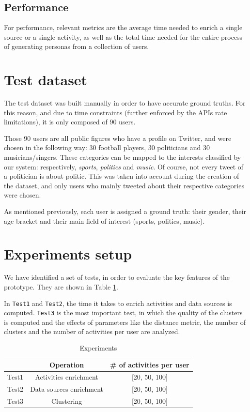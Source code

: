 \subsection{Performance}
For performance, relevant metrics are the average time needed to enrich a single source or a single activity, as well as the total time needed for the entire process of generating personas from a collection of users.

\section{Test dataset}
The test dataset was built manually in order to have accurate ground truths. For this reason, and due to time constraints (further enforced by the APIs rate limitations), it is only composed of 90 users.

Those 90 users are all public figures who have a profile on Twitter, and were chosen in the following way: 30 football players, 30 politicians and 30 musicians/singers. These categories can be mapped to the interests classified by our system: respectively, \textit{sports}, \textit{politics} and \textit{music}. Of course, not every tweet of a politician is about politic. This was taken into account during the creation of the dataset, and only users who mainly tweeted about their respective categories were chosen.

As mentioned previously, each user is assigned a ground truth: their gender, their age bracket and their main field of interest (sports, politics, music).

\section{Experiments setup}
We have identified a set of tests, in order to evaluate the key features of the prototype. They are shown in Table \ref{table:experiments}.

In \texttt{Test1} and \texttt{Test2}, the time it takes to enrich activities and data sources is computed. \texttt{Test3} is the most important test, in which the quality of the clusters is computed and the effects of parameters like the distance metric, the number of clusters and the number of activities per user are analyzed.

\begin{table}[h]
\centering
\begin{tabular}{|c|c|c|}
    \hline
    & \textbf{Operation} & \textbf{\# of activities per user} \\
    \hline
    Test1 & Activities enrichment & [20, 50, 100] \\
    \hline
    Test2 & Data sources enrichment & [20, 50, 100] \\
    \hline
    Test3 & Clustering & [20, 50, 100] \\
    \hline
\end{tabular}
\caption{Experiments}
\label{table:experiments}
\end{table}

